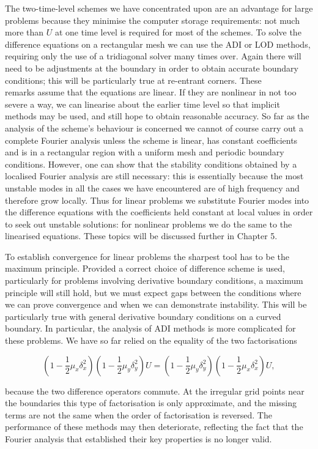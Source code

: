 \documentclass[10pt]{article}
\begin{document}
The two-time-level schemes we have concentrated upon are an advantage for large problems because they minimise the computer storage requirements: not much more than \(U\) at one time level is required for most of the schemes. To solve the difference equations on a rectangular mesh we can use the ADI or LOD methods, requiring only the use of a tridiagonal solver many times over. Again there will need to be adjustments at the boundary in order to obtain accurate boundary conditions; this will be particularly true at re-entrant corners. These\\
remarks assume that the equations are linear. If they are nonlinear in not too severe a way, we can linearise about the earlier time level so that implicit methods may be used, and still hope to obtain reasonable accuracy. So far as the analysis of the scheme's behaviour is concerned we cannot of course carry out a complete Fourier analysis unless the scheme is linear, has constant coefficients and is in a rectangular region with a uniform mesh and periodic boundary conditions. However, one can show that the stability conditions obtained by a localised Fourier analysis are still necessary: this is essentially because the most unstable modes in all the cases we have encountered are of high frequency and therefore grow locally. Thus for linear problems we substitute Fourier modes into the difference equations with the coefficients held constant at local values in order to seek out unstable solutions: for nonlinear problems we do the same to the linearised equations. These topics will be discussed further in Chapter 5.

To establish convergence for linear problems the sharpest tool has to be the maximum principle. Provided a correct choice of difference scheme is used, particularly for problems involving derivative boundary conditions, a maximum principle will still hold, but we must expect gaps between the conditions where we can prove convergence and when we can demonstrate instability. This will be particularly true with general derivative boundary conditions on a curved boundary. In particular, the analysis of ADI methods is more complicated for these problems. We have so far relied on the equality of the two factorisations

\[
\left(1-\frac{1}{2} \mu_{x} \delta_{x}^{2}\right)\left(1-\frac{1}{2} \mu_{y} \delta_{y}^{2}\right) U=\left(1-\frac{1}{2} \mu_{y} \delta_{y}^{2}\right)\left(1-\frac{1}{2} \mu_{x} \delta_{x}^{2}\right) U,
\]

because the two difference operators commute. At the irregular grid points near the boundaries this type of factorisation is only approximate, and the missing terms are not the same when the order of factorisation is reversed. The performance of these methods may then deteriorate, reflecting the fact that the Fourier analysis that established their key properties is no longer valid.
\end{document}
